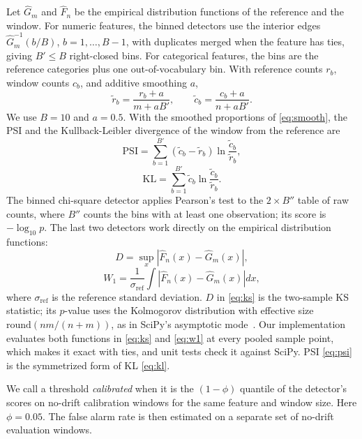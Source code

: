 \documentclass[journal]{IEEEtran}
\begin{document}
Let $\hat{G}_m$ and $\hat{F}_n$ be the empirical distribution functions of the reference and the window. For numeric features, the binned detectors use the interior edges $\hat{G}_m^{-1}(b/B)$, $b=1,\dots,B-1$, with duplicates merged when the feature has ties, giving $B'\le B$ right-closed bins. For categorical features, the bins are the reference categories plus one out-of-vocabulary bin. With reference counts $r_b$, window counts $c_b$, and additive smoothing $a$,
\begin{equation}
\tilde{r}_b=\frac{r_b+a}{m+aB'},\qquad \tilde{c}_b=\frac{c_b+a}{n+aB'}.
\label{eq:smooth}
\end{equation}
We use $B=10$ and $a=0.5$. With the smoothed proportions of \eqref{eq:smooth}, the PSI and the Kullback-Leibler divergence of the window from the reference are
\begin{equation}
\mathrm{PSI}=\sum_{b=1}^{B'}(\tilde{c}_b-\tilde{r}_b)\ln\frac{\tilde{c}_b}{\tilde{r}_b},
\label{eq:psi}
\end{equation}
\begin{equation}
\mathrm{KL}=\sum_{b=1}^{B'}\tilde{c}_b\ln\frac{\tilde{c}_b}{\tilde{r}_b}.
\label{eq:kl}
\end{equation}
The binned chi-square detector applies Pearson's test to the $2\times B''$ table of raw counts, where $B''$ counts the bins with at least one observation; its score is $-\log_{10}p$. The last two detectors work directly on the empirical distribution functions:
\begin{equation}
D=\sup_x\left|\hat{F}_n(x)-\hat{G}_m(x)\right|,
\label{eq:ks}
\end{equation}
\begin{equation}
W_1=\frac{1}{\sigma_{\mathrm{ref}}}\int\left|\hat{F}_n(x)-\hat{G}_m(x)\right|dx,
\label{eq:w1}
\end{equation}
where $\sigma_{\mathrm{ref}}$ is the reference standard deviation. $D$ in \eqref{eq:ks} is the two-sample KS statistic; its $p$-value uses the Kolmogorov distribution with effective size $\mathrm{round}(nm/(n+m))$, as in SciPy's asymptotic mode~\cite{virtanen2020}. Our implementation evaluates both functions in \eqref{eq:ks} and \eqref{eq:w1} at every pooled sample point, which makes it exact with ties, and unit tests check it against SciPy. PSI \eqref{eq:psi} is the symmetrized form of KL \eqref{eq:kl}.

We call a threshold \emph{calibrated} when it is the $(1-\phi)$ quantile of the detector's scores on no-drift calibration windows for the same feature and window size. Here $\phi=0.05$. The false alarm rate is then estimated on a separate set of no-drift evaluation windows.
\end{document}
